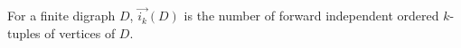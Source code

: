 \begin{definition}
For a finite digraph \(D\), \(\overrightarrow{i_k}(D)\) is the number of forward independent ordered \(k\)-tuples of vertices of \(D\).
\end{definition}
